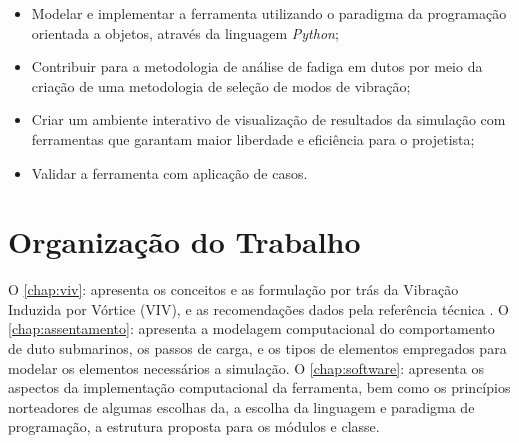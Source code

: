 \begin{itemize}
    \item Modelar e implementar a ferramenta utilizando o paradigma da programação orientada a objetos, através da linguagem \textit{Python};
    \item Contribuir para a metodologia de análise de fadiga em dutos por meio da criação de uma metodologia de seleção de modos de vibração;
    \item Criar um ambiente interativo de visualização de resultados da simulação com ferramentas que garantam maior liberdade e eficiência para o projetista;
    \item Validar a ferramenta com aplicação de casos.
\end{itemize}

\section{Organização do Trabalho}

O \autoref{chap:viv}: apresenta os conceitos e as formulação por trás da Vibração Induzida por Vórtice (VIV), e as recomendações dados pela referência técnica . O \autoref{chap:assentamento}: apresenta a modelagem computacional do comportamento de duto submarinos, os passos de carga, e os tipos de elementos empregados para modelar os elementos necessários a simulação. O \autoref{chap:software}: apresenta os aspectos da implementação computacional da ferramenta, bem como os princípios norteadores de algumas escolhas da, a escolha da linguagem e paradigma de programação, a estrutura proposta para os módulos e classe.
